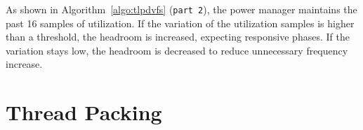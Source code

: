 \begin{comment}
\begin{table}[tb]
\begin{center}
\begin{tabular}{r|r}
\hline \hline
Threshold       & Probability   \\ \hline
80      &       0.003   \\
85      &       0.013   \\
90      &       0.003   \\
95      &       0.009   \\
\hline \hline
\end{tabular}
\end{center}
\caption{Probability of peak utilization with the interative applications}
\label{tab:prob_peak}
\end{table}

To show the utilization stability of interative applications, Table~\ref{tab:prob_peak} presents
the probability of peak utilization for the interative applications.
It checks whether CPU utilization reaches 99-100\%, meaning the current
frequency setting can be too low for the current CPU load. Such a low frequency setting can degrade the application
performance, as the application cannot receive enough CPU resource.
It uses the on-demand governor, and uses four different {\tt up-threshold} settings from the conservative 80\% 
to the most aggresive 95\%. As shown by the table, the utility of interactive applications do not require
the conservative policy by the on-deman governor, as with even with a very high threadhold of 95\%, the probability
\end{comment}

As shown in Algorithm~\ref{algo:tlpdvfs} ({\tt part 2}),
the power manager maintains the past 16 samples of utilization.
If the variation of the utilization samples is higher than a threshold, the headroom
is increased, expecting responsive phases. If the variation stays low, the headroom
is decreased to reduce unnecessary frequency increase.

\section{Thread Packing}

